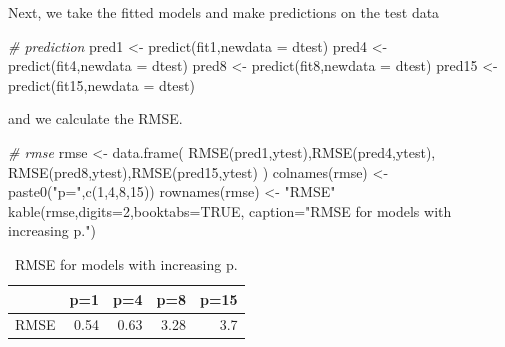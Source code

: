 \documentclass[
]{book}
\newenvironment{Shaded}{\begin{snugshade}}{\end{snugshade}}
\newcommand{\AttributeTok}[1]{\textcolor[rgb]{0.77,0.63,0.00}{#1}}
\newcommand{\CommentTok}[1]{\textcolor[rgb]{0.56,0.35,0.01}{\textit{#1}}}
\newcommand{\ConstantTok}[1]{\textcolor[rgb]{0.00,0.00,0.00}{#1}}
\newcommand{\DecValTok}[1]{\textcolor[rgb]{0.00,0.00,0.81}{#1}}
\newcommand{\FunctionTok}[1]{\textcolor[rgb]{0.00,0.00,0.00}{#1}}
\newcommand{\NormalTok}[1]{#1}
\newcommand{\OtherTok}[1]{\textcolor[rgb]{0.56,0.35,0.01}{#1}}
\newcommand{\StringTok}[1]{\textcolor[rgb]{0.31,0.60,0.02}{#1}}
\begin{document}
Next, we take the fitted models and make predictions on the test data

\begin{Shaded}
\begin{Highlighting}[]
\CommentTok{\# prediction}
\NormalTok{pred1 }\OtherTok{\textless{}{-}} \FunctionTok{predict}\NormalTok{(fit1,}\AttributeTok{newdata =}\NormalTok{ dtest)}
\NormalTok{pred4 }\OtherTok{\textless{}{-}} \FunctionTok{predict}\NormalTok{(fit4,}\AttributeTok{newdata =}\NormalTok{ dtest)}
\NormalTok{pred8 }\OtherTok{\textless{}{-}} \FunctionTok{predict}\NormalTok{(fit8,}\AttributeTok{newdata =}\NormalTok{ dtest)}
\NormalTok{pred15 }\OtherTok{\textless{}{-}} \FunctionTok{predict}\NormalTok{(fit15,}\AttributeTok{newdata =}\NormalTok{ dtest)}
\end{Highlighting}
\end{Shaded}

and we calculate the RMSE.

\begin{Shaded}
\begin{Highlighting}[]
\CommentTok{\# rmse}
\NormalTok{rmse }\OtherTok{\textless{}{-}} \FunctionTok{data.frame}\NormalTok{(}
  \FunctionTok{RMSE}\NormalTok{(pred1,ytest),}\FunctionTok{RMSE}\NormalTok{(pred4,ytest),}
  \FunctionTok{RMSE}\NormalTok{(pred8,ytest),}\FunctionTok{RMSE}\NormalTok{(pred15,ytest)}
\NormalTok{)}
\FunctionTok{colnames}\NormalTok{(rmse) }\OtherTok{\textless{}{-}} \FunctionTok{paste0}\NormalTok{(}\StringTok{"p="}\NormalTok{,}\FunctionTok{c}\NormalTok{(}\DecValTok{1}\NormalTok{,}\DecValTok{4}\NormalTok{,}\DecValTok{8}\NormalTok{,}\DecValTok{15}\NormalTok{))}
\FunctionTok{rownames}\NormalTok{(rmse) }\OtherTok{\textless{}{-}} \StringTok{"RMSE"}
\FunctionTok{kable}\NormalTok{(rmse,}\AttributeTok{digits=}\DecValTok{2}\NormalTok{,}\AttributeTok{booktabs=}\ConstantTok{TRUE}\NormalTok{,}
      \AttributeTok{caption=}\StringTok{"RMSE for models with increasing p."}\NormalTok{)}
\end{Highlighting}
\end{Shaded}

\begin{table}

\caption{\label{tab:unnamed-chunk-17}RMSE for models with increasing p.}
\centering
\begin{tabular}[t]{lrrrr}
\toprule
  & p=1 & p=4 & p=8 & p=15\\
\midrule
RMSE & 0.54 & 0.63 & 3.28 & 3.7\\
\bottomrule
\end{tabular}
\end{table}
\end{document}
